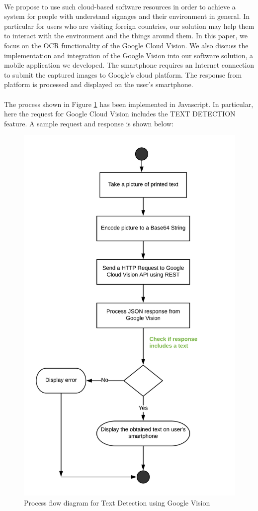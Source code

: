 \documentclass[12pt]{article}
\begin{document}
\paragraph{}We propose to use such cloud-based software resources in order to achieve a system for people with understand signages and their environment in general. In particular for users who are visiting foreign countries, our solution may help them to interact with the environment and the things around them. In this paper, we focus on the OCR functionality of the Google Cloud Vision. We also discuss the implementation and integration of the Google Vision into our software solution, a mobile application we developed. The smartphone requires an Internet connection to submit the captured images to Google’s cloud platform. The response from platform is processed and displayed on the user's smartphone.

\paragraph{}The process shown in Figure \ref{fig:vision} has been implemented in Javascript. In particular, here the request for Google Cloud Vision includes the TEXT DETECTION feature. A sample request and response is shown below:

\begin{figure}[H]
	\centering
	\includegraphics[width=0.75\linewidth]{media/VISION_API.png}
	\caption{Process flow diagram for Text Detection using Google Vision}
	\label{fig:vision}
\end{figure} 
\end{document}
